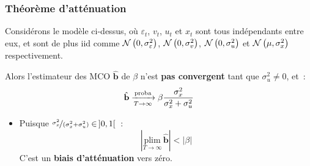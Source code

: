 \documentclass[10pt]{beamer}
\begin{document}
\begin{frame}
  \frametitle{Théorème d'atténuation}

  \begin{theorem}\label{thm:attenuation}
    Considérons le modèle ci-dessus, où $\varepsilon_t$, $v_t$, $u_t$ et $x_t$
    sont tous indépendants entre eux, et sont de plus iid comme
    $\mathcal N\left(0,\sigma_{\varepsilon}^2\right)$, $\mathcal N\left(0,\sigma_v^2\right)$, $\mathcal N\left(0,\sigma_u^2\right)$ et
    $\mathcal N\left(\mu,\sigma_x^2\right)$ respectivement.

    Alors l'estimateur des MCO $\hat{\mathbf b}$ de $\beta$ n'est \textbf{pas
      convergent} tant que $\sigma_u^2 \neq 0$, et~:
    \[ \hat{\mathbf b} \xrightarrow[T\rightarrow\infty]{\text{proba}} \beta \frac{\sigma_x^2}{\sigma_x^2 + \sigma_u^2} \]
  \end{theorem}

  \bigskip

  \begin{itemize}
  \item Puisque $\nicefrac{\sigma_x^2}{(\sigma_x^2+\sigma_u^2)} \in\, ]0,1[$~:
    \[
      \left\lvert \underset{T\rightarrow\infty}{\text{plim}}\, \hat{\mathbf b}\right\rvert < \left\lvert \beta \right\rvert
    \]
    C'est un \textbf{biais d'atténuation} vers zéro.
  \end{itemize}

\end{frame}
\end{document}
